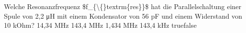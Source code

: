     {Welche Resonanzfrequenz \$f\_\{\textbackslash\{\}textrm\{res\}\}\$ hat die Parallelschaltung einer Spule von 2,2 μH mit einem Kondensator von 56 pF und einem Widerstand von 10 kOhm?}
    {14,34 MHz}
    {143,4 MHz}
    {1,434 MHz}
    {143,4 kHz}
    {true}{false}